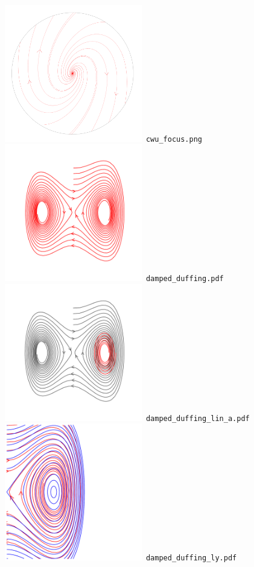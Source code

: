 \documentclass[a4paper]{amsart}
\begin{document}
\includegraphics[width=6cm]{cwu_focus.png}\verb+ cwu_focus.png+\\
\includegraphics[width=6cm]{damped_duffing.pdf}\verb+ damped_duffing.pdf+\\
\includegraphics[width=6cm]{damped_duffing_lin_a.pdf}\verb+ damped_duffing_lin_a.pdf+\\
\includegraphics[width=6cm]{damped_duffing_ly.pdf}\verb+ damped_duffing_ly.pdf+\\
\end{document}
